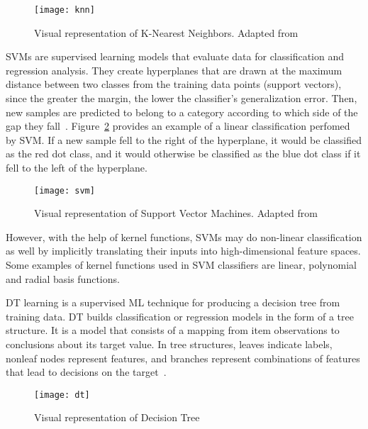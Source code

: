 \begin{figure}[htbp]
    \centering
    \texttt{[image: knn]}
    \caption{Visual representation of K-Nearest Neighbors. Adapted from~\cite{Bronshtein2017AMedium}}
    \label{fig:knn}
\end{figure}

\gls{SVM}s are supervised learning models that evaluate data for classification and regression analysis. They create hyperplanes that are drawn at the maximum distance between two classes from the training data points (support vectors), since the greater the margin, the lower the classifier's generalization error. Then, new samples are predicted to belong to a category according to which side of the gap they fall~\cite{Mahesh2019MachineReview}. Figure~\ref{fig:svm} provides an example of a linear classification perfomed by \gls{SVM}. If a new sample fell to the right of the hyperplane, it would be classified as the red dot class, and it would otherwise be classified as the blue dot class if it fell to the left of the hyperplane. 

\begin{figure}[htbp]
    \centering
    \texttt{[image: svm]}
    \caption{Visual representation of Support Vector Machines. Adapted from~\cite{MaquinaExplicada}}
    \label{fig:svm}
\end{figure}

However, with the help of kernel functions, \gls{SVM}s may do non-linear classification as well by implicitly translating their inputs into high-dimensional feature spaces. Some examples of kernel functions used in \gls{SVM} classifiers are linear, polynomial and radial basis functions.

\gls{DT} learning is a supervised \gls{ML} technique for producing a decision tree from training data. \gls{DT} builds classification or regression models in the form of a tree structure. It is a model that consists of a mapping from item observations to conclusions about its target value. In tree structures, leaves indicate labels, nonleaf nodes represent features, and branches represent combinations of features that lead to decisions on the target~\cite{Tan2015CodeQuality}.

\begin{figure}[htbp]
    \centering
    \texttt{[image: dt]}
    \caption{Visual representation of Decision Tree}
    \label{fig:dt}
\end{figure}

